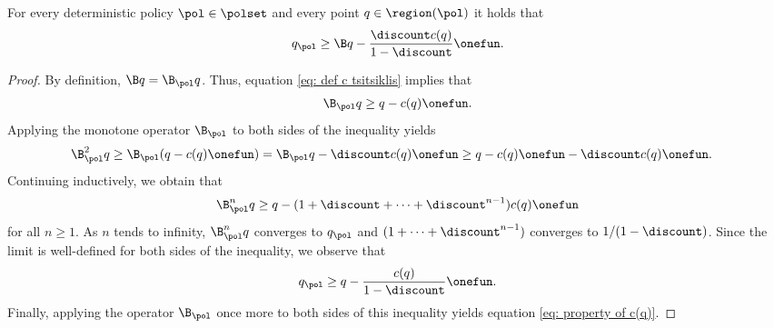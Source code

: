 \begin{lemma}
\label{thm: tsitsiklis helper lemma}
For every deterministic policy $\pol \in \polset$
and every point $q \in \region(\pol)$ it holds that
\begin{align}
\label{eq: property of c(q)}
    q_\pol \geq \B q - \dfrac{\discount c(q)}{1-\discount} \onefun .
\end{align}
\end{lemma}
\begin{proof}
By definition, $\B q = \B_\pol q$. Thus, equation \eqref{eq: def c tsitsiklis} implies that
\begin{align*}
    \B_\pol q \geq q - c(q) \onefun .
\end{align*}
Applying the monotone operator $\B_\pol$ to both sides of the inequality yields
\begin{align*}
    \B_\pol^2 q 
    &\geq \B_\pol (q - c(q) \onefun)
    = \B_\pol q - \discount c(q) \onefun
    \geq q - c(q) \onefun - \discount c(q) \onefun .
\end{align*}
Continuing inductively, we obtain that
\begin{align*}
    \B_\pol^n q \geq q - (1 + \discount + \dots + \discount^{n-1}) c(q) \onefun
\end{align*}
for all $n \geq 1$.
As $n$ tends to infinity, $\B_\pol^n q$ converges to $q_\pol$ and $(1 + \dots + \discount^{n-1})$ converges to $1/(1-\discount)$. Since the limit is well-defined for both sides of the inequality, we observe that
\begin{align*}
    q_\pol \geq q - \dfrac{c(q)}{1-\discount} \onefun .
\end{align*}
Finally, applying the operator $\B_\pol$ once more to both sides of this inequality yields equation \eqref{eq: property of c(q)}.
\end{proof}
